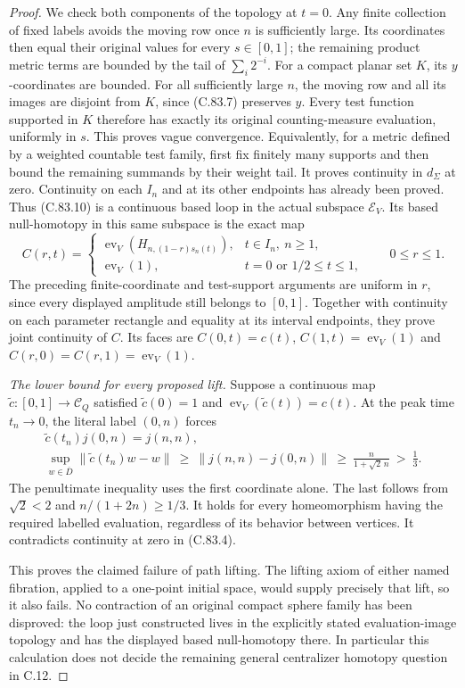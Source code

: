 \begin{proof}
We check both components of the topology
at $t=0$. Any finite collection of fixed
labels avoids the moving row once $n$
is sufficiently large. Its coordinates
then equal their original values for
every $s\in[0,1]$; the remaining product
metric terms are bounded by the tail of
$\sum_i2^{-i}$.
For a compact planar set $K$, its
$y$-coordinates are bounded. For all
sufficiently large $n$, the moving row
and all its images are disjoint from
$K$, since (C.83.7) preserves $y$.
Every test function supported in $K$
therefore has exactly its original
counting-measure evaluation, uniformly
in $s$. This proves vague convergence.
Equivalently, for a metric defined by
a weighted countable test family, first
fix finitely many supports and then
bound the remaining summands by their
weight tail. It proves continuity in
$d_\Sigma$ at zero. Continuity on each
$I_n$ and at its other endpoints has
already been proved. Thus (C.83.10) is
a continuous based loop in the actual
subspace $\mathscr E_V$.
Its based null-homotopy in this same
subspace is the exact map
\[
 C(r,t)=
 \begin{cases}
  \operatorname{ev}_V(H_{n,(1-r)s_n(t)}),
                           &t\in I_n,\ n\geq1,\\
  \operatorname{ev}_V(1),&t=0\text{ or }1/2\leq t\leq1,
 \end{cases}
 \qquad 0\leq r\leq1.
                                                               \tag{C.83.11}
\]
The preceding finite-coordinate and
test-support arguments are uniform in
$r$, since every displayed amplitude
still belongs to $[0,1]$. Together with
continuity on each parameter rectangle
and equality at its interval endpoints,
they prove joint continuity of $C$.
Its faces are $C(0,t)=c(t)$,
$C(1,t)=\operatorname{ev}_V(1)$ and
$C(r,0)=C(r,1)=\operatorname{ev}_V(1)$.

\emph{The lower bound for every proposed lift.}
Suppose a continuous map
$\widetilde c:[0,1]\to\mathscr C_Q$
satisfied
$\widetilde c(0)=1$ and
$\operatorname{ev}_V(\widetilde c(t))=c(t)$.
At the peak time $t_n\to0$, the literal
label $(0,n)$ forces
\[
 \begin{gathered}
 \widetilde c(t_n)j(0,n)=j(n,n),\\
 \sup_{w\in\overline D}
       \|\widetilde c(t_n)w-w\|
 \ \geq\ \|j(n,n)-j(0,n)\|
 \ \geq\ \frac{n}{1+\sqrt2\,n}
 \ >\ \frac13 .
 \end{gathered}                                                  \tag{C.83.12}
\]
The penultimate inequality uses the first
coordinate alone. The last follows from
$\sqrt2<2$ and $n/(1+2n)\geq1/3$.
It holds for every homeomorphism having
the required labelled evaluation,
regardless of its behavior between
vertices. It contradicts continuity at
zero in (C.83.4).

This proves the claimed failure of
path lifting. The lifting axiom of
either named fibration, applied to a
one-point initial space, would supply
precisely that lift, so it also fails.
No contraction of an original compact
sphere family has been disproved:
the loop just constructed lives in
the explicitly stated evaluation-image
topology and has the displayed based
null-homotopy there. In particular this calculation
does not decide the remaining general
centralizer homotopy question in C.12.
\end{proof}
